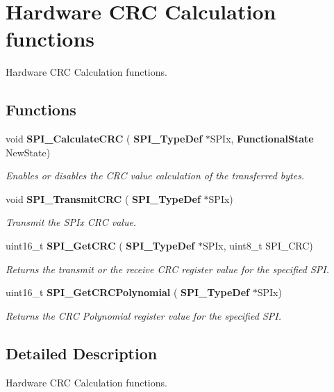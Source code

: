 \section{Hardware C\+RC Calculation functions}
\label{group__SPI__Group3}


Hardware C\+RC Calculation functions.  


\subsection*{Functions}
\begin{DoxyCompactItemize}
\item 
void \textbf{ S\+P\+I\+\_\+\+Calculate\+C\+RC} (\textbf{ S\+P\+I\+\_\+\+Type\+Def} $\ast$S\+P\+Ix, \textbf{ Functional\+State} New\+State)
\begin{DoxyCompactList}\small\item\em Enables or disables the C\+RC value calculation of the transferred bytes. \end{DoxyCompactList}\item 
void \textbf{ S\+P\+I\+\_\+\+Transmit\+C\+RC} (\textbf{ S\+P\+I\+\_\+\+Type\+Def} $\ast$S\+P\+Ix)
\begin{DoxyCompactList}\small\item\em Transmit the S\+P\+Ix C\+RC value. \end{DoxyCompactList}\item 
uint16\+\_\+t \textbf{ S\+P\+I\+\_\+\+Get\+C\+RC} (\textbf{ S\+P\+I\+\_\+\+Type\+Def} $\ast$S\+P\+Ix, uint8\+\_\+t S\+P\+I\+\_\+\+C\+RC)
\begin{DoxyCompactList}\small\item\em Returns the transmit or the receive C\+RC register value for the specified S\+PI. \end{DoxyCompactList}\item 
uint16\+\_\+t \textbf{ S\+P\+I\+\_\+\+Get\+C\+R\+C\+Polynomial} (\textbf{ S\+P\+I\+\_\+\+Type\+Def} $\ast$S\+P\+Ix)
\begin{DoxyCompactList}\small\item\em Returns the C\+RC Polynomial register value for the specified S\+PI. \end{DoxyCompactList}\end{DoxyCompactItemize}


\subsection{Detailed Description}
Hardware C\+RC Calculation functions. 

